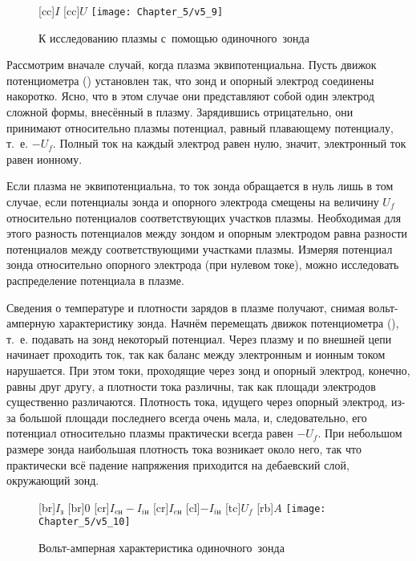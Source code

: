 \begin{figure}
	[cc]{$I$}
	[cc]{$U$}
	\texttt{[image: Chapter\_5/v5\_9]}
	\caption{К исследованию плазмы с~помощью одиночного~зонда}
\end{figure}

Рассмотрим вначале случай, когда плазма эквипотенциальна. Пусть движок потенциометра () установлен так, что зонд и
опорный электрод соединены накоротко. Ясно, что в этом случае они представляют собой один электрод сложной формы,
внесённый в плазму. Зарядившись отрицательно, они принимают относительно плазмы потенциал, равный плавающему потенциалу,
т.~е. $-U_f$. Полный ток на каждый электрод равен нулю, значит, электронный ток равен ионному.

Если плазма не эквипотенциальна, то ток зонда обращается в нуль лишь в том случае, если потенциалы зонда и опорного
электрода смещены на величину $U_f$ относительно потенциалов соответствующих участков плазмы. Необходимая для этого
разность потенциалов между зондом и опорным электродом равна разности потенциалов между соответствующими участками
плазмы. Измеряя потенциал зонда относительно опорного электрода (при нулевом токе), можно исследовать распределение
потенциала в плазме.

Сведения о температуре и плотности зарядов в плазме получают, снимая вольт-амперную характеристику зонда. Начнём
перемещать движок потенциометра (), т.~е. подавать на зонд некоторый потенциал. Через плазму и по внешней цепи
начинает проходить ток, так как баланс между электронным и ионным током нарушается. При этом
токи, проходящие через зонд и опорный электрод, конечно, равны друг другу, а плотности тока различны, так как площади
электродов существенно различаются. Плотность тока, идущего через опорный электрод, из-за большой площади последнего
всегда очень мала, и, следовательно, его потенциал относительно плазмы практически всегда равен $-U_f$. При небольшом
размере зонда наибольшая плотность тока возникает около него, так что практически всё падение напряжения приходится на
дебаевский слой, окружающий зонд.

\begin{wrapfigure}{o}{0.5\textwidth}
	[br]{$I_з$}
	[br]{0}
	[cr]{$I_{eн}-I_{iн}$}
	[cr]{$I_{eн}$}
	[cl]{$-I_{iн}$}
	[tc]{$U_f$}
	[rb]{$A$}
	\texttt{[image: Chapter\_5/v5\_10]}
	\caption{Вольт-амперная характеристика одиночного~зонда}
\end{wrapfigure}


